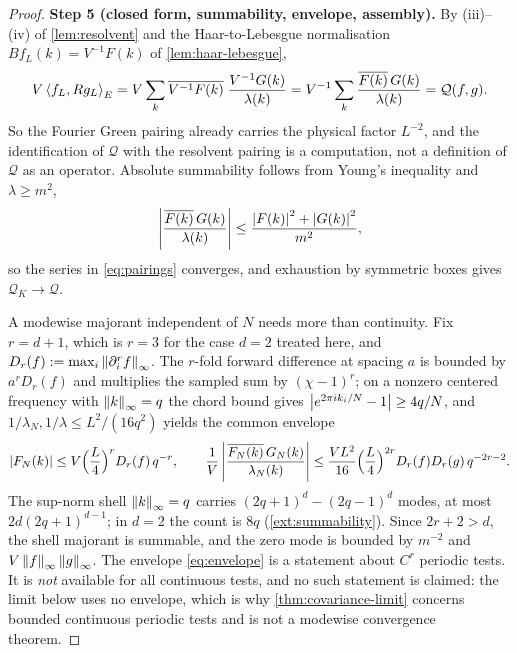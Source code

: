 \begin{proof}
\textbf{Step 5 (closed form, summability, envelope, assembly).} By (iii)--(iv)
of \cref{lem:resolvent} and the Haar-to-Lebesgue normalisation
$Bf_L(k)=V^{-1}F(k)$ of \cref{lem:haar-lebesgue},
\begin{equation}\label{eq:closed-form}
  V\left\langle f_L, Rg_L \right\rangle_E
  =V\sum_k\overline{V^{-1}F(k)}\;\frac{V^{-1}G(k)}{\lambda(k)}
  =V^{-1}\sum_k\frac{\overline{F(k)}\,G(k)}{\lambda(k)}
  =\mathcal Q(f,g).
\end{equation}
So the Fourier Green pairing already carries the physical factor $L^{-2}$, and
the identification of $\mathcal Q$ with the resolvent pairing is a computation,
not a definition of $\mathcal Q$ as an operator. Absolute summability follows
from Young's inequality and $\lambda\ge m^2$,
\begin{equation}\label{eq:young}
  \left| \frac{\overline{F(k)}\,G(k)}{\lambda(k)} \right|
  \le\frac{\left| F(k) \right|^2+\left| G(k) \right|^2}{m^2},
\end{equation}
so the series in \eqref{eq:pairings} converges, and exhaustion by symmetric
boxes gives $\mathcal Q_K\to\mathcal Q$.

A modewise majorant independent of $N$ needs more than continuity. Fix $r=d+1$,
which is $r=3$ for the case $d=2$ treated here, and
$D_r(f):=\max_i\left\| \partial_i^r f \right\|_\infty$. The $r$-fold forward difference at
spacing $a$ is bounded by $a^rD_r(f)$ and multiplies the sampled sum by
$(\chi-1)^r$; on a nonzero centered frequency with $\left\| k \right\|_\infty=q$ the chord
bound gives $\left| e^{2\pi i k_i/N}-1 \right|\ge4q/N$, and
$1/\lambda_N,1/\lambda\le L^2/(16q^2)$ yields the common envelope
\begin{equation}\label{eq:envelope}
  \left| F_N(k) \right|\le V\Bigl(\frac L4\Bigr)^{r}D_r(f)\,q^{-r},
  \qquad
  \frac1V\left| \frac{\overline{F_N(k)}\,G_N(k)}{\lambda_N(k)} \right|
  \le\frac{VL^2}{16}\Bigl(\frac L4\Bigr)^{2r}D_r(f)D_r(g)\,q^{-2r-2}.
\end{equation}
The sup-norm shell $\left\| k \right\|_\infty=q$ carries $(2q+1)^d-(2q-1)^d$ modes, at
most $2d(2q+1)^{d-1}$; in $d=2$ the count is $8q$ (\cref{ext:summability}).
Since $2r+2>d$, the shell majorant is summable, and the zero mode is bounded by
$m^{-2}$ and $V\left\| f \right\|_\infty\left\| g \right\|_\infty$. The envelope \eqref{eq:envelope}
is a statement about $C^{r}$ periodic tests. It is \emph{not} available for all
continuous tests, and no such statement is claimed: the limit below uses no
envelope, which is why \cref{thm:covariance-limit} concerns bounded continuous
periodic tests and is not a modewise convergence theorem.


\end{proof}
